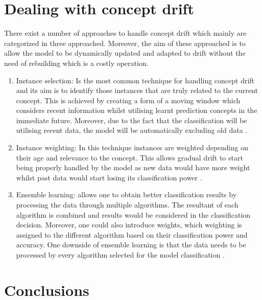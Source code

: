 \section{Dealing with concept drift}
There exist a number of approaches to handle concept drift which mainly are categorized in three approached. Moreover, the aim of these approached is to allow the model to be dynamically updated and adapted to drift without the need of rebuilding which is a costly operation. 
   \begin{enumerate}
  \item Instance selection: Is the most common technique for handling concept drift and its aim is to identify those instances that are truly related to the current concept. This is achieved by creating a form of a moving window which considers recent information whilst utilising learnt prediction concepts in the immediate future. Moreover, due to the fact that the classification will be utilising recent data, the model will be automatically excluding old data \citep{Webb:2016:CCD:2962863.2962874}.

 \item Instance weighting: In this technique instances are weighted depending on their age and relevance to the concept. This allows gradual drift to start being properly handled by the model as new data would have more weight whilst past data would start losing its classification power \citep{Webb:2016:CCD:2962863.2962874}. 

 \item  Ensemble learning: allows one to obtain better classification results by processing the data through multiple algorithms. The resultant of each algorithm is combined and results would be considered in the classification decision. Moreover, one could also introduce weights, which weighting is assigned to the different algorithm based on their classification power and accuracy. One downside of ensemble learning is that the data needs to be processed by every algorithm selected for the model classification \citep{Webb:2016:CCD:2962863.2962874}. 
 
 \end{enumerate}
  
\section{Conclusions}

